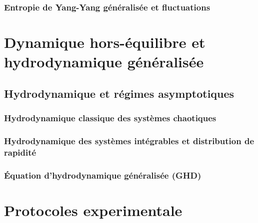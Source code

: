 \section{Entropie de Yang-Yang généralisée et fluctuations}


\part{Dynamique hors-équilibre et hydrodynamique généralisée}

\chapter{Hydrodynamique et régimes asymptotiques}
\minitoc
\section{Hydrodynamique classique des systèmes chaotiques}
\section{Hydrodynamique des systèmes intégrables et distribution de rapidité}
\section{Équation d’hydrodynamique généralisée (GHD)}

%

\part{Protocoles experimentale}

